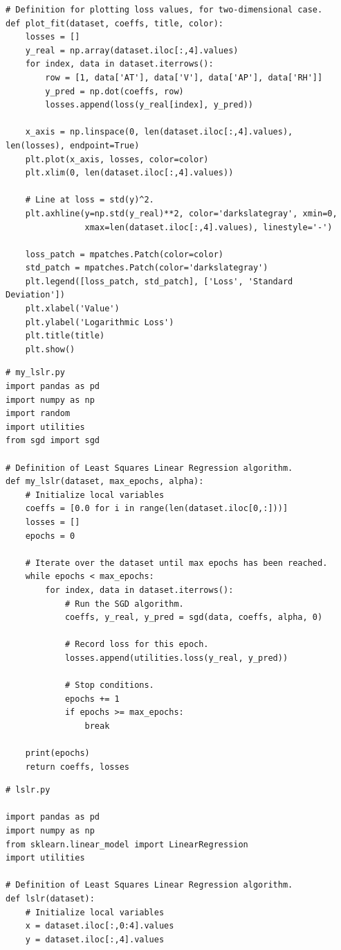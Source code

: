 \documentclass[letterpaper]{article} %
\begin{document}
{\begin{verbatim}
# Definition for plotting loss values, for two-dimensional case.
def plot_fit(dataset, coeffs, title, color):
    losses = []
    y_real = np.array(dataset.iloc[:,4].values)
    for index, data in dataset.iterrows():
        row = [1, data['AT'], data['V'], data['AP'], data['RH']]
        y_pred = np.dot(coeffs, row)
        losses.append(loss(y_real[index], y_pred))

    x_axis = np.linspace(0, len(dataset.iloc[:,4].values), len(losses), endpoint=True)
    plt.plot(x_axis, losses, color=color)
    plt.xlim(0, len(dataset.iloc[:,4].values))

    # Line at loss = std(y)^2.
    plt.axhline(y=np.std(y_real)**2, color='darkslategray', xmin=0,
                xmax=len(dataset.iloc[:,4].values), linestyle='-')

    loss_patch = mpatches.Patch(color=color)
    std_patch = mpatches.Patch(color='darkslategray')
    plt.legend([loss_patch, std_patch], ['Loss', 'Standard Deviation'])
    plt.xlabel('Value')
    plt.ylabel('Logarithmic Loss')
    plt.title(title)
    plt.show()
\end{verbatim}
\bigskip
\begin{verbatim}
# my_lslr.py
import pandas as pd
import numpy as np
import random
import utilities
from sgd import sgd

# Definition of Least Squares Linear Regression algorithm.
def my_lslr(dataset, max_epochs, alpha):
    # Initialize local variables
    coeffs = [0.0 for i in range(len(dataset.iloc[0,:]))]
    losses = []
    epochs = 0

    # Iterate over the dataset until max epochs has been reached.
    while epochs < max_epochs:
        for index, data in dataset.iterrows():
            # Run the SGD algorithm.
            coeffs, y_real, y_pred = sgd(data, coeffs, alpha, 0)

            # Record loss for this epoch.
            losses.append(utilities.loss(y_real, y_pred))

            # Stop conditions.
            epochs += 1
            if epochs >= max_epochs:
                break

    print(epochs)
    return coeffs, losses
\end{verbatim}
\bigskip
\begin{verbatim}
# lslr.py

import pandas as pd
import numpy as np
from sklearn.linear_model import LinearRegression
import utilities

# Definition of Least Squares Linear Regression algorithm.
def lslr(dataset):
    # Initialize local variables
    x = dataset.iloc[:,0:4].values
    y = dataset.iloc[:,4].values


\end{verbatim}}
\end{document}

